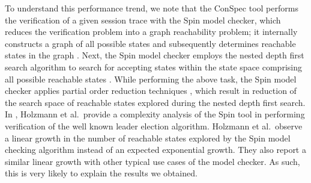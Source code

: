 \documentclass[journal,compsoc]{IEEEtran}
\begin{document}
To understand this performance trend, we note that the ConSpec tool performs the verification of a given session trace with the  Spin model checker, which reduces the verification problem into a graph reachability problem; it internally constructs a graph of all possible states and subsequently determines  reachable states in the graph \cite{Holzmann:1997:MCS:260897.260902}. Next, the Spin model checker  employs the nested depth first search algorithm \cite{DBLP:conf/dimacs/HolzmannPY96} to search for accepting states within the state space comprising all possible reachable states \cite{DBLP:conf/tacas/SchwoonE05}. 
    While performing the above task, the Spin model checker  applies partial order reduction techniques \cite{Peled1994}, which result in reduction of the search space of reachable states explored during the nested depth first search. In  \cite{Holzmann:1997:MCS:260897.260902}, Holzmann et al.\ provide a complexity analysis of the Spin tool in performing verification of the well known leader election algorithm. Holzmann et al.\ observe a linear growth in the number of reachable states explored by the Spin model checking algorithm instead of an expected exponential growth. They also report a similar linear growth with other typical use cases of the model checker. As such, this is very likely to explain the results we obtained.


\end{document}
